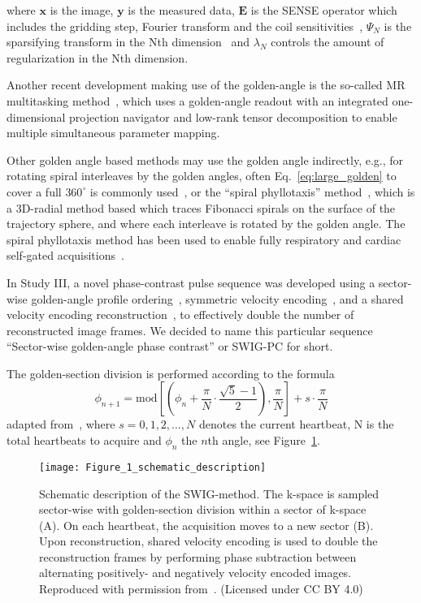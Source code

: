 where $\textbf{x}$ is the image, $\textbf{y}$ is the measured data, $\textbf{E}$ is the SENSE operator which includes the gridding step, Fourier transform and the coil sensitivities~\cite{Pruessmann2001}, $\Psi_N$ is the sparsifying transform in the Nth dimension~\cite{Lustig2007} and $\lambda_N$ controls the amount of regularization in the Nth dimension.

Another recent development making use of the golden-angle is the so-called MR multitasking method~\cite{Christodoulou2018, Shaw2019}, which uses a golden-angle readout with an integrated one-dimensional projection navigator and low-rank tensor decomposition to enable multiple simultaneous parameter mapping.

Other golden angle based methods may use the golden angle indirectly, e.g., for rotating spiral interleaves by the golden angles, often Eq.~\ref{eq:large_golden} to cover a full $360^\circ$ is commonly used~\cite{Kim2011}, or the ``spiral phyllotaxis'' method~\cite{Piccini2011, Piccini2017, Coppo2015}, which is a 3D-radial method based which traces Fibonacci spirals on the surface of the trajectory sphere, and where each interleave is rotated by the golden angle. The spiral phyllotaxis method has been used to enable fully respiratory and cardiac self-gated acquisitions~\cite{DiSopra2019}.

In Study III, a novel phase-contrast pulse sequence was developed using a sector-wise golden-angle profile ordering~\cite{Han2016}, symmetric velocity encoding~\cite{Bernstein1992}, and a shared velocity encoding reconstruction~\cite{Bernstein1994, Lin2012}, to effectively double the number of reconstructed image frames. We decided to name this particular sequence ``Sector-wise golden-angle phase contrast'' or SWIG-PC for short. 

The golden-section division is performed according to the formula
\begin{equation}
    \phi_{n+1} = \textrm{mod} \left[ \left( \phi_n + \frac{\pi}{N} \cdot \frac{\sqrt{5}-1}{2} \right), \frac{\pi}{N} \right] + s \cdot \frac{\pi}{N}
\end{equation}
adapted from~\cite{Han2016}, where $s = 0, 1, 2, \dots, N$ denotes the current heartbeat, N is the total heartbeats to acquire and $\phi_n$ the $n$th angle, see Figure~\ref{fig:swig_overview}.

\begin{figure}
    \centering
    \texttt{[image: Figure\_1\_schematic\_description]}
    \caption{Schematic description of the SWIG-method. The k-space is sampled sector-wise with golden-section division within a sector of k-space (A). On each heartbeat, the acquisition moves to a new sector (B). Upon reconstruction, shared velocity encoding is used to double the reconstruction frames by performing phase subtraction between alternating positively- and negatively velocity encoded images. Reproduced with permission from~\cite{Fyrdahl2020}. (Licensed under CC BY 4.0) }
    \label{fig:swig_overview}
\end{figure}

